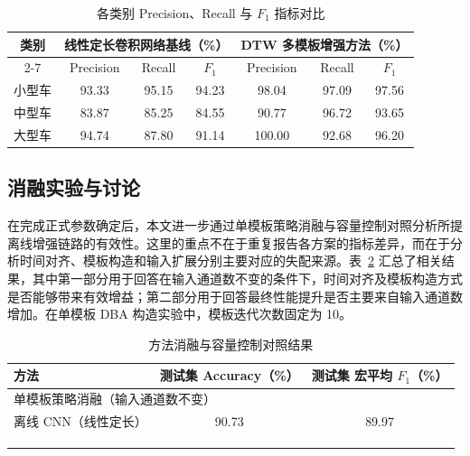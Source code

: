 \documentclass{xdupgthesis}
\providecommand{\FloatBarrier}{}
\begin{document}
\begin{table}[!htbp]
\centering
\small
\caption{各类别 Precision、Recall 与 $F_1$ 指标对比}
\label{tab:ch3_prf_by_class}
\renewcommand{\arraystretch}{1.25}
\setlength{\tabcolsep}{5pt}
\begin{tabular}{c ccc ccc}
\hline
类别 & \multicolumn{3}{c}{线性定长卷积网络基线（\%）} & \multicolumn{3}{c}{DTW 多模板增强方法（\%）} \\
\cline{2-7}
 & Precision & Recall & $F_1$ & Precision & Recall & $F_1$ \\
\hline
小型车 & 93.33 & 95.15 & 94.23 & 98.04 & 97.09 & 97.56 \\
中型车 & 83.87 & 85.25 & 84.55 & 90.77 & 96.72 & 93.65 \\
大型车 & 94.74 & 87.80 & 91.14 & 100.00 & 92.68 & 96.20 \\
\hline
\end{tabular}
\end{table}

\FloatBarrier

\subsection{消融实验与讨论}
\label{subsec:ch3_ablation}

在完成正式参数确定后，本文进一步通过单模板策略消融与容量控制对照分析所提离线增强链路的有效性。这里的重点不在于重复报告各方案的指标差异，而在于分析时间对齐、模板构造和输入扩展分别主要对应的失配来源。表~\ref{tab:ch3_ablation_methods} 汇总了相关结果，其中第一部分用于回答在输入通道数不变的条件下，时间对齐及模板构造方式是否能够带来有效增益；第二部分用于回答最终性能提升是否主要来自输入通道数增加。在单模板 DBA 构造实验中，模板迭代次数固定为 10。

\begin{table}[!htbp]
\centering
\small
\caption{方法消融与容量控制对照结果}
\label{tab:ch3_ablation_methods}
\renewcommand{\arraystretch}{1.15}
\setlength{\tabcolsep}{6pt}
\begin{tabular}{lcc}
    \hline
    方法 & 测试集 Accuracy（\%） & 测试集 宏平均 $F_1$（\%） \\
    \hline
    \multicolumn{3}{l}{单模板策略消融（输入通道数不变）}\\
    \addlinespace[2pt]
    离线 CNN（线性定长） & 90.73 & 89.97 \\
    \\
    \addlinespace[3pt]
    \multicolumn{3}{l}{容量控制对照}\\
    \addlinespace[2pt]
    \\
    \hline
\end{tabular}
\end{table}
\end{document}
